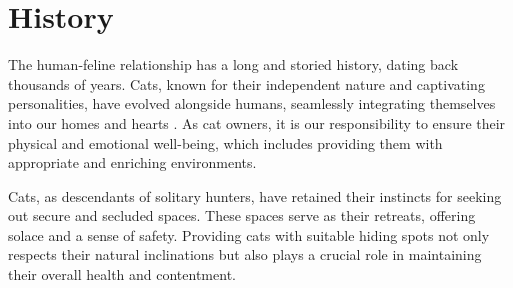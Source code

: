 \section{History}

The human-feline relationship has a long and storied history, dating back thousands of years. Cats, known for their independent nature and captivating personalities, have evolved alongside humans, seamlessly integrating themselves into our homes and hearts \cite{wiki:cat}. As cat owners, it is our responsibility to ensure their physical and emotional well-being, which includes providing them with appropriate and enriching environments.

Cats, as descendants of solitary hunters, have retained their instincts for seeking out secure and secluded spaces. These spaces serve as their retreats, offering solace and a sense of safety. Providing cats with suitable hiding spots not only respects their natural inclinations but also plays a crucial role in maintaining their overall health and contentment.

